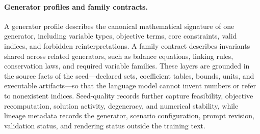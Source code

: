 \paragraph{Generator profiles and family contracts.}
A generator profile describes the canonical mathematical signature of one
generator, including variable types, objective terms, core constraints, valid
indices, and forbidden reinterpretations.  A family contract describes
invariants shared across related generators, such as balance equations, linking
rules, conservation laws, and required variable families.  These layers are
grounded in the source facts of the seed---declared sets, coefficient tables,
bounds, units, and executable artifacts---so that the language model cannot
invent numbers or refer to nonexistent indices.  Seed-quality records further
capture feasibility, objective recomputation, solution activity, degeneracy, and
numerical stability, while lineage metadata records the generator, scenario
configuration, prompt revision, validation status, and rendering status outside
the training text.


